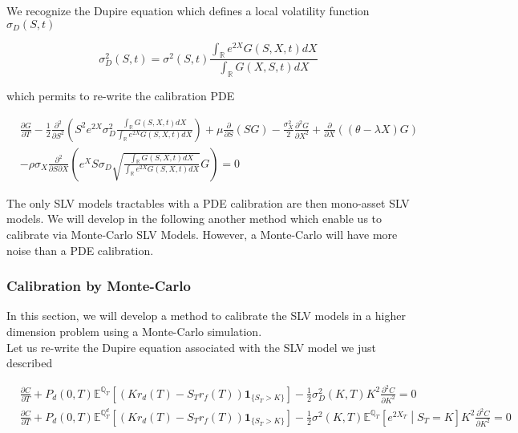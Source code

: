 \documentclass{article}
\begin{document}
\noindent We recognize the Dupire equation which defines a local volatility function $\sigma_D(S,t)$

\begin{equation}
	\sigma_D^2(S,t) = \sigma^2(S,t) \frac{\int_\mathbb{R} e^{2X} G(S,X,t) dX}{\int_\mathbb{R} G(X,S,t) dX}
\end{equation}

\noindent which permits to re-write the calibration PDE

\begin{equation}
\begin{aligned}
\label{eq:SLVCalibrationPDE}
	&\frac{\partial G}{\partial T}
	- \frac{1}{2} \frac{\partial^2}{\partial S^2} \left(S^2 e^{2X} \sigma_D^2 \frac{\int_\mathbb{R} G(S,X,t) dX}{\int_\mathbb{R} e^{2X} G(S,X,t) dX}\right)
+ \mu \frac{\partial}{\partial S}\left( S G\right)
- \frac{\sigma_X^2}{2} \frac{\partial^2 G}{\partial X^2}
+ \frac{\partial }{\partial X} \left((\theta - \lambda X) G\right)\\
&- \rho \sigma_X \frac{\partial^2}{\partial S \partial X} \left(e^X S \sigma_D \sqrt{\frac{\int_\mathbb{R} G(S,X,t) dX}{\int_\mathbb{R} e^{2X} G(S,X,t) dX}} G\right) = 0
\end{aligned}
\end{equation}

The only SLV models tractables with a PDE calibration are then mono-asset SLV models. We will develop in the following another method which enable us to calibrate via Monte-Carlo SLV Models. However, a Monte-Carlo will have more noise than a PDE calibration.

\subsubsection{Calibration by Monte-Carlo}
In this section, we will develop a method to calibrate the SLV models in a higher dimension problem using a Monte-Carlo simulation.\\

\noindent Let us re-write the Dupire equation associated with the SLV model we just described

\begin{equation}
\begin{aligned}
	&\frac{\partial C}{\partial T} + P_d(0,T) \mathbb{E}^{\mathbb{Q}_T} \left[ \left(K r_d(T) - S_T r_f(T)\right) \textbf{1}_{\{S_T > K\}}\right] - \frac{1}{2} \sigma_D^2(K,T) K^2 \frac{\partial^2 C}{\partial K^2} = 0\\
	&\frac{\partial C}{\partial T} + P_d(0,T) \mathbb{E}^{\mathbb{Q}_T^d} \left[ \left(K r_d(T) - S_T r_f(T)\right) \textbf{1}_{\{S_T > K\}}\right] - \frac{1}{2} \sigma^2(K,T) \mathbb{E}^{\mathbb{Q}_T}\left[e^{2X_T}\middle| S_T=K\right] K^2 \frac{\partial^2 C}{\partial K^2} = 0\\
\end{aligned}
\end{equation}
\end{document}

